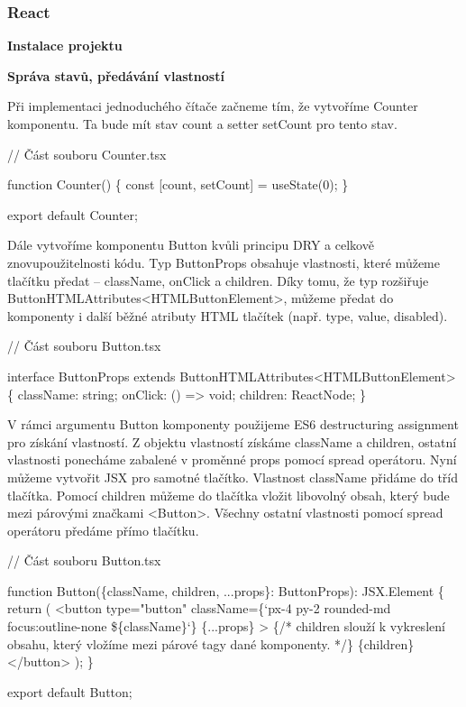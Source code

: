 \subsubsection{React}

\begin{flushleft}
  \textbf{Instalace projektu}
\end{flushleft}

\begin{flushleft}
  \textbf{Správa stavů, předávání vlastností}
\end{flushleft}

Při implementaci jednoduchého čítače začneme tím, že vytvoříme Counter komponentu. Ta bude mít stav count a setter setCount pro tento stav.

\begin{prog}
// Část souboru Counter.tsx

function Counter() \{
  const [count, setCount] = useState(0);
\}

export default Counter;
\end{prog}

Dále vytvoříme komponentu Button kvůli principu DRY a celkově znovupoužitelnosti kódu. 
Typ ButtonProps obsahuje vlastnosti, které můžeme tlačítku předat -- className, onClick a children. 
Díky tomu, že typ rozšiřuje ButtonHTMLAttributes<HTMLButtonElement>, můžeme předat do komponenty i další běžné atributy HTML tlačítek (např. type, value, disabled).

\begin{prog}
// Část souboru Button.tsx

interface ButtonProps extends ButtonHTMLAttributes<HTMLButtonElement> \{
  className: string;
  onClick: () => void;
  children: ReactNode;
\}
\end{prog}

V rámci argumentu Button komponenty použijeme ES6 destructuring assignment pro získání vlastností. 
Z objektu vlastností získáme className a children, ostatní vlastnosti ponecháme zabalené v proměnné props pomocí spread operátoru. 
Nyní můžeme vytvořit JSX pro samotné tlačítko. Vlastnost className přidáme do tříd tlačítka. 
Pomocí children můžeme do tlačítka vložit libovolný obsah, který bude mezi párovými značkami <Button>. 
Všechny ostatní vlastnosti pomocí spread operátoru předáme přímo tlačítku.

\begin{prog}
// Část souboru Button.tsx

function Button(\{className, children, ...props\}: ButtonProps): JSX.Element \{
  return (
    <button
      type="button"
      className=\{`px-4 py-2 rounded-md focus:outline-none \$\{className\}`\}
      \{...props\}
    >
      \{/* children slouží k vykreslení obsahu, 
        který vložíme mezi párové tagy dané komponenty. */\}
      \{children\}
    </button>
  );
\}

export default Button;
\end{prog}

